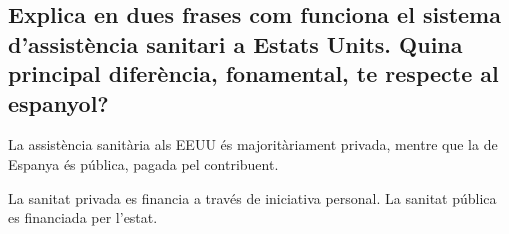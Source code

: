 \subsection{Explica en dues frases com funciona el sistema d’assistència 
sanitari a Estats Units. Quina principal diferència, fonamental, 
te respecte al espanyol?}

La assistència sanitària als EEUU és majoritàriament privada, mentre
que la de Espanya és pública, pagada pel contribuent.

La sanitat privada es financia a través de iniciativa personal. La sanitat
pública es financiada per l'estat.
